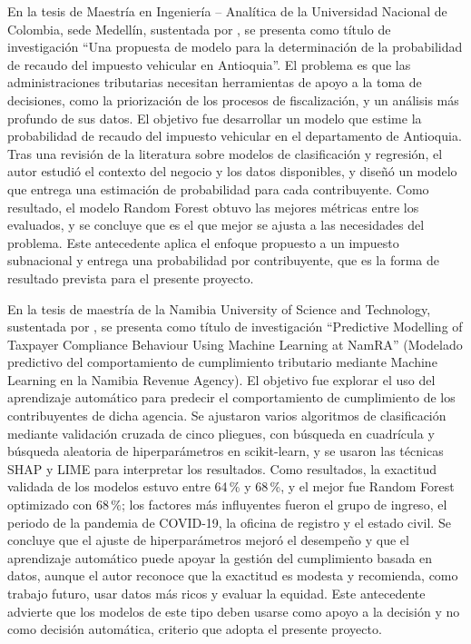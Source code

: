\documentclass[12pt,a4paper]{report}
\begin{document}
En la tesis de Maestría en Ingeniería -- Analítica de la Universidad Nacional de Colombia, sede Medellín, sustentada por \textcite{orozco2023}, se presenta como título de investigación ``Una propuesta de modelo para la determinación de la probabilidad de recaudo del impuesto vehicular en Antioquia''. El problema es que las administraciones tributarias necesitan herramientas de apoyo a la toma de decisiones, como la priorización de los procesos de fiscalización, y un análisis más profundo de sus datos. El objetivo fue desarrollar un modelo que estime la probabilidad de recaudo del impuesto vehicular en el departamento de Antioquia. Tras una revisión de la literatura sobre modelos de clasificación y regresión, el autor estudió el contexto del negocio y los datos disponibles, y diseñó un modelo que entrega una estimación de probabilidad para cada contribuyente. Como resultado, el modelo Random Forest obtuvo las mejores métricas entre los evaluados, y se concluye que es el que mejor se ajusta a las necesidades del problema. Este antecedente aplica el enfoque propuesto a un impuesto subnacional y entrega una probabilidad por contribuyente, que es la forma de resultado prevista para el presente proyecto.

En la tesis de maestría de la Namibia University of Science and Technology, sustentada por \textcite{sifani2025}, se presenta como título de investigación ``Predictive Modelling of Taxpayer Compliance Behaviour Using Machine Learning at NamRA'' (Modelado predictivo del comportamiento de cumplimiento tributario mediante Machine Learning en la Namibia Revenue Agency). El objetivo fue explorar el uso del aprendizaje automático para predecir el comportamiento de cumplimiento de los contribuyentes de dicha agencia. Se ajustaron varios algoritmos de clasificación mediante validación cruzada de cinco pliegues, con búsqueda en cuadrícula y búsqueda aleatoria de hiperparámetros en scikit-learn, y se usaron las técnicas SHAP y LIME para interpretar los resultados. Como resultados, la exactitud validada de los modelos estuvo entre 64\,\% y 68\,\%, y el mejor fue Random Forest optimizado con 68\,\%; los factores más influyentes fueron el grupo de ingreso, el periodo de la pandemia de COVID-19, la oficina de registro y el estado civil. Se concluye que el ajuste de hiperparámetros mejoró el desempeño y que el aprendizaje automático puede apoyar la gestión del cumplimiento basada en datos, aunque el autor reconoce que la exactitud es modesta y recomienda, como trabajo futuro, usar datos más ricos y evaluar la equidad. Este antecedente advierte que los modelos de este tipo deben usarse como apoyo a la decisión y no como decisión automática, criterio que adopta el presente proyecto.
\end{document}
